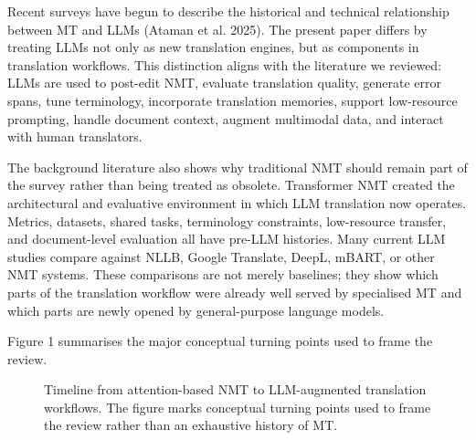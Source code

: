 \documentclass[11pt]{article}
\begin{document}
Recent surveys have begun to describe the historical and technical relationship between MT and LLMs (Ataman et al. 2025). The present paper differs by treating LLMs not only as new translation engines, but as components in translation workflows. This distinction aligns with the literature we reviewed: LLMs are used to post-edit NMT, evaluate translation quality, generate error spans, tune terminology, incorporate translation memories, support low-resource prompting, handle document context, augment multimodal data, and interact with human translators.

The background literature also shows why traditional NMT should remain part of the survey rather than being treated as obsolete. Transformer NMT created the architectural and evaluative environment in which LLM translation now operates. Metrics, datasets, shared tasks, terminology constraints, low-resource transfer, and document-level evaluation all have pre-LLM histories. Many current LLM studies compare against NLLB, Google Translate, DeepL, mBART, or other NMT systems. These comparisons are not merely baselines; they show which parts of the translation workflow were already well served by specialised MT and which parts are newly opened by general-purpose language models.

Figure 1 summarises the major conceptual turning points used to frame the review.

\begin{figure}[t]
\centering
{}
\caption{Timeline from attention-based NMT to LLM-augmented translation workflows. The figure marks conceptual turning points used to frame the review rather than an exhaustive history of MT.}
\end{figure}
\end{document}
